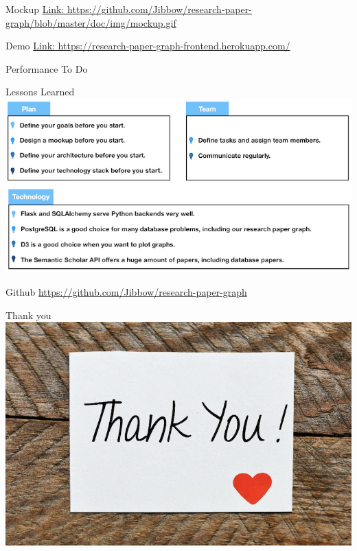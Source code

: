 \documentclass{beamer}
\begin{document}
\begin{frame}{Mockup}
    \url{Link: https://github.com/Jibbow/research-paper-graph/blob/master/doc/img/mockup.gif}
\end{frame}

\begin{frame}{Demo}
    \url{Link: https://research-paper-graph-frontend.herokuapp.com/}
\end{frame}

\begin{frame}{Performance}
{To Do}
\end{frame}

\begin{frame}{Lessons Learned}
    \includegraphics{img_21.png}
\end{frame}

\begin{frame}{Github}
    \url{https://github.com/Jibbow/research-paper-graph}
\end{frame}

\begin{frame}{Thank you}
    \includegraphics{img_05.png}
\end{frame}
\end{document}
